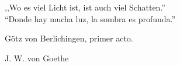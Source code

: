 \begin{dedication}
,,Wo es viel Licht ist, ist auch viel Schatten.''\\
``Donde hay mucha luz, la sombra es profunda.''

Götz von Berlichingen, primer acto.

J. W. von Goethe
\end{dedication}
